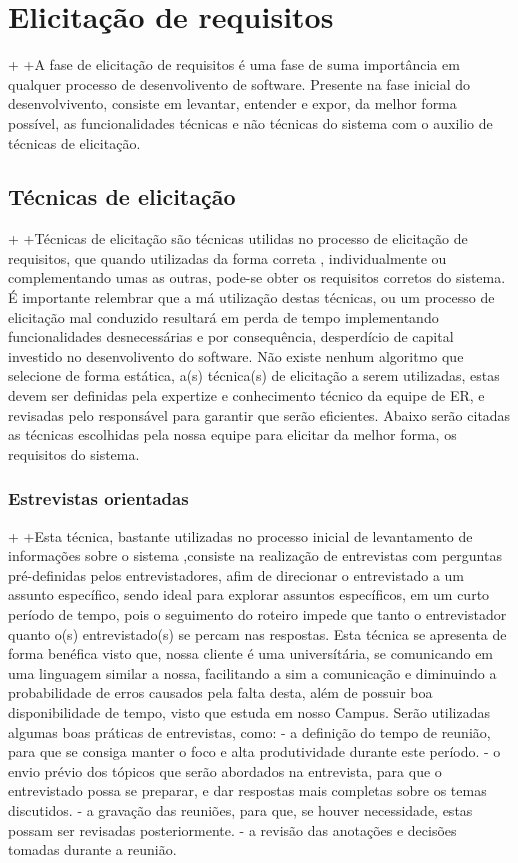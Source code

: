 \chapter{Elicitação de requisitos}
+
+A fase de elicitação de requisitos é uma fase de suma importância em qualquer processo de  desenvolivento de software. 
Presente na fase inicial do desenvolvivento, consiste em levantar, entender e expor, da melhor forma possível, as funcionalidades técnicas e não técnicas do sistema
com o auxilio de técnicas de elicitação.

  \section{Técnicas de elicitação}
 +
 +Técnicas de elicitação são técnicas utilidas no processo de elicitação de requisitos, que quando utilizadas da forma correta
  , individualmente ou complementando umas as outras, pode-se obter os requisitos corretos do sistema.
  É importante relembrar que a má utilização destas técnicas, ou um processo de elicitação 
  mal conduzido resultará em perda de tempo implementando funcionalidades desnecessárias e por 
  consequência, desperdício de capital investido no desenvolivento do software.
  Não existe nenhum algoritmo que selecione de forma estática, a(s) técnica(s) de elicitação a serem utilizadas, 
  estas devem ser definidas pela expertize e conhecimento técnico da equipe de ER, e revisadas pelo responsável para garantir
  que serão eficientes.
  Abaixo serão citadas as técnicas escolhidas pela nossa equipe para elicitar da melhor forma, os requisitos do sistema.
  
  \subsection{Estrevistas orientadas}
  +
  +Esta técnica, bastante utilizadas no processo inicial de levantamento de informações sobre o sistema
  ,consiste na realização de entrevistas com perguntas pré-definidas pelos entrevistadores, afim de direcionar o 
  entrevistado a um assunto específico, sendo ideal para explorar assuntos específicos, em um curto período de tempo,
  pois o seguimento do roteiro impede que tanto o entrevistador quanto o(s) entrevistado(s) se percam nas respostas. Esta 
  técnica se apresenta de forma benéfica visto que, nossa cliente é uma universítária, se comunicando em uma linguagem 
  similar a nossa, facilitando a sim a comunicação e diminuindo a probabilidade de erros causados pela falta desta, além de
  possuir boa disponibilidade de tempo, visto que estuda em nosso Campus.
  Serão utilizadas algumas boas práticas de entrevistas, como: 
  - a definição do tempo de reunião, para que se consiga manter o foco
  e alta produtividade durante este período.
  - o envio prévio dos tópicos que serão abordados na entrevista, para que o entrevistado possa se preparar, e dar respostas mais
  completas sobre os temas discutidos.
  - a gravação das reuniões, para que, se houver necessidade, estas possam ser revisadas posteriormente.
  - a revisão das anotações e decisões tomadas durante a reunião.
  
